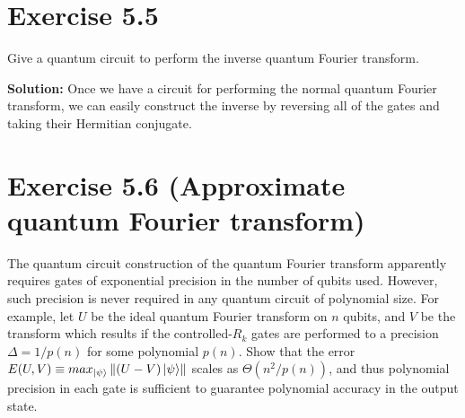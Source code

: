 \documentclass{book}
\begin{document}
\section*{Exercise 5.5} 
    Give a quantum circuit to perform the inverse quantum Fourier transform.

    \textbf{Solution:} Once we have a circuit for performing the normal quantum Fourier transform, we can easily construct the inverse by reversing all of the gates and taking their Hermitian conjugate. 

\section*{Exercise 5.6 (Approximate quantum Fourier transform)}
    The quantum circuit construction of the quantum Fourier transform apparently requires gates of exponential precision in the number of qubits used. However, such precision is never required in any quantum circuit of polynomial size. For example, let $U$ be the ideal quantum Fourier transform on $n$ qubits, and $V$ be the transform which results if the controlled-$R_k$ gates are performed to a precision $\Delta = 1/p(n)$ for some polynomial $p(n)$. Show that the error $E(U, V) \equiv max_{\ket{\psi}} \left\|(U - V)\ket{\psi}\right\|$ scales as $\Theta(n^2/p(n))$, and thus polynomial precision in each gate is sufficient to guarantee polynomial accuracy in the output state.
\end{document}
